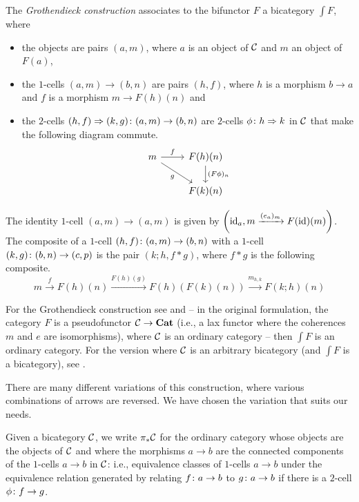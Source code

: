 \documentclass{article}
\begin{document}
\begin{definition}
  The \emph{Grothendieck construction} associates to the bifunctor $F$ a bicategory $\int F$, where
  \begin{itemize}
    \item the objects are pairs $(a, m)$, where $a$ is an object of ${\mathcal{C}}$ and $m$ an object of $F(a)$,
    \item the $1$-cells $(a, m) \to (b, n)$ are pairs $(h, f)$, where $h$ is a morphism $b \to a$ and $f$ is a morphism $m \to F(h)(n)$ and
    \item the $2$-cells $(h, f) \Rightarrow (k, g) \colon (a,m) \to (b,n)$ are $2$-cells $\phi\colon h \Rightarrow k$ in ${\mathcal{C}}$ that make the following diagram commute.
      \[
        \begin{tikzcd}
          m \arrow[r, "f"] \arrow[dr, "g"']
            & F(h)(n) \arrow[d, "(F\phi)_n"] \\
            & F(k)(n)
        \end{tikzcd}
        \]
  \end{itemize}
  The identity $1$-cell $(a,m)\to(a,m)$ is given by $\left(\operatorname{id}_a,m \xrightarrow{(e_a)_m} F(\operatorname{id})(m)\right)$.
  The composite of a $1$-cell $(h,f)\colon (a,m) \to (b,n)$ with a $1$-cell $(k,g)\colon (b,n) \to (c,p)$ is the pair $(k;h,f*g)$, where $f*g$ is the following composite.
  \[
    m \xrightarrow{f}
    F(h)(n) \xrightarrow{F(h)(g)}
    F(h)(F(k)(n)) \xrightarrow{m_{h,k}}
    F(k;h)(n)
    \]
\end{definition}
\begin{remark}
  For the Grothendieck construction see \cite[VI.8]{SGA1} and \cite[B1.3.1]{Elephant} -- in the original formulation, the category $F$ is a pseudofunctor ${\mathcal{C}} \to {\normalfont\textbf{Cat}}$ (i.e., a lax functor where the coherences $m$ and $e$ are isomorphisms), where ${\mathcal{C}}$ is an ordinary category -- then $\int F$ is an ordinary category.
  For the version where ${\mathcal{C}}$ is an arbitrary bicategory (and $\int F$ is a bicategory), see \cite{FibrationsInBicategories}.

  There are many different variations of this construction, where various combinations of arrows are reversed.  
  We have chosen the variation that suits our needs.
\end{remark}

\begin{definition}
  Given a bicategory ${\mathcal{C}}$, we write $\pi_*{\mathcal{C}}$ for the ordinary category whose objects are the objects of ${\mathcal{C}}$ and where the morphisms $a\to b$ are the connected components of the $1$-cells $a\to b$ in ${\mathcal{C}}$: i.e., equivalence classes of $1$-cells $a\to b$ under the equivalence relation generated by relating $f\colon a \to b$ to $g \colon a \to b$ if there is a $2$-cell $\phi \colon f \to g$.
\end{definition}
\end{document}

